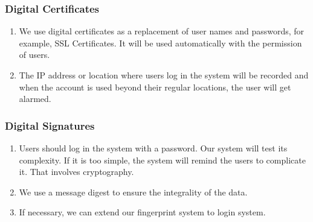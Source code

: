 \documentclass[12pt]{scrreprt}
\begin{document}
\subsubsection{Digital Certificates}
\begin{enumerate}
  \item We use digital certificates as a replacement of user names and
  passwords, for example, SSL Certificates. It will be used automatically
  with the permission of users.
  \item The IP address or location where users log in the system will be
  recorded and when the account is used beyond their regular locations, the
  user will get alarmed.
\end{enumerate}

\subsubsection{Digital Signatures}
\begin{enumerate}
  \item Users should log in the system with a password. Our system will
  test its complexity. If it is too simple, the system will remind the
  users to complicate it. That involves cryptography.
  \item We use a message digest to ensure the integrality of the data.
  \item If necessary, we can extend our fingerprint system to login system.
\end{enumerate}
\end{document}
